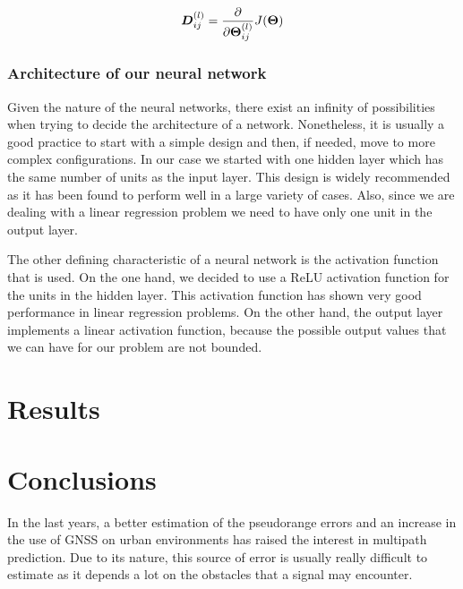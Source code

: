 \documentclass[a4paper, report, oneside, UKenglish]{memoir}
\newcommand{\bD}{\boldsymbol{D}}
\newcommand{\bTheta}{\boldsymbol{\Theta}}
\begin{document}
\begin{equation}
    \bD_{ij}^{(l)} = \pdv{}{\bTheta_{ij}^{(l)}} J(\bTheta)
\end{equation}


\subsection{Architecture of our neural network}
Given the nature of the neural networks, there exist an infinity of possibilities when trying to decide the architecture of a network. Nonetheless, it is usually a good practice to start with a simple design and then, if needed, move to more complex configurations. In our case we started with one hidden layer which has the same number of units as the input layer. This design is widely recommended as it has been found to perform well in a large variety of cases. Also, since we are dealing with a linear regression problem we need to have only one unit in the output layer.

The other defining characteristic of a neural network is the activation function that is used. On the one hand, we decided to use a ReLU activation function for the units in the hidden layer. This activation function has shown very good performance in linear regression problems. On the other hand, the output layer implements a linear activation function, because the possible output values that we can have for our problem are not bounded.


\chapter{Results} \label{ch:results}


\chapter{Conclusions}\label{ch:conclusions}
In the last years, a better estimation of the pseudorange errors and an increase in the use of GNSS on urban environments has raised the interest in multipath prediction. Due to its nature, this source of error is usually really difficult to estimate as it depends a lot on the obstacles that a signal may encounter. 


\clearpage
\printbibliography
\end{document}
